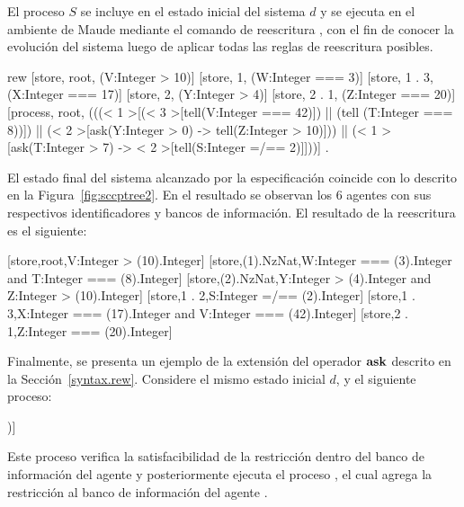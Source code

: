 El proceso $S$ se incluye en el estado inicial del sistema $d$ y se ejecuta en el ambiente de Maude mediante el comando de reescritura , con el fin de conocer la evoluci\'on del sistema luego de aplicar todas las reglas de reescritura posibles.

\begin{maude}
rew { [store, root, (V:Integer > 10)]
  [store, 1, (W:Integer === 3)]
  [store, 1 . 3, (X:Integer === 17)]
  [store, 2, (Y:Integer > 4)]
  [store, 2 . 1, (Z:Integer === 20)]
  [process, root, (((< 1 >[(< 3 >[tell(V:Integer === 42)]) || 
     (tell (T:Integer === 8))]) || 
     (< 2 >[ask(Y:Integer > 0) -> tell(Z:Integer > 10)])) || 
     (< 1 >[ask(T:Integer > 7) -> 
      < 2 >[tell(S:Integer =/== 2)]]))] } .
\end{maude}

El estado final del sistema alcanzado por la especificaci\'on coincide con lo descrito en la Figura~\ref{fig:sccptree2}. En el resultado se observan los 6 agentes con sus respectivos identificadores y bancos de informaci\'on. El resultado de la reescritura es el siguiente:

\begin{maude}
{ [store,root,V:Integer > (10).Integer]
  [store,(1).NzNat,W:Integer === (3).Integer 
           and T:Integer === (8).Integer] 
  [store,(2).NzNat,Y:Integer > (4).Integer 
           and Z:Integer > (10).Integer] 
  [store,1 . 2,S:Integer =/== (2).Integer] 
  [store,1 . 3,X:Integer === (17).Integer 
           and V:Integer === (42).Integer] 
  [store,2 . 1,Z:Integer === (20).Integer] }
\end{maude}

Finalmente, se presenta un ejemplo de la extensi\'on del operador ${\bf ask}$ descrito en la Secci\'on~\ref{syntax.rew}. Considere el mismo estado inicial $d$, y el siguiente proceso:

\begin{maude}
[process, root, (ask< 1 >(W:Integer < 15) -> 
   < 2 . 1 >[tell(M:Integer >= 4)])]
\end{maude}

Este proceso verifica la satisfacibilidad de la restricci\'on  dentro del banco de informaci\'on del agente  y posteriormente ejecuta el proceso , el cual agrega la restricci\'on  al banco de informaci\'on del agente .

